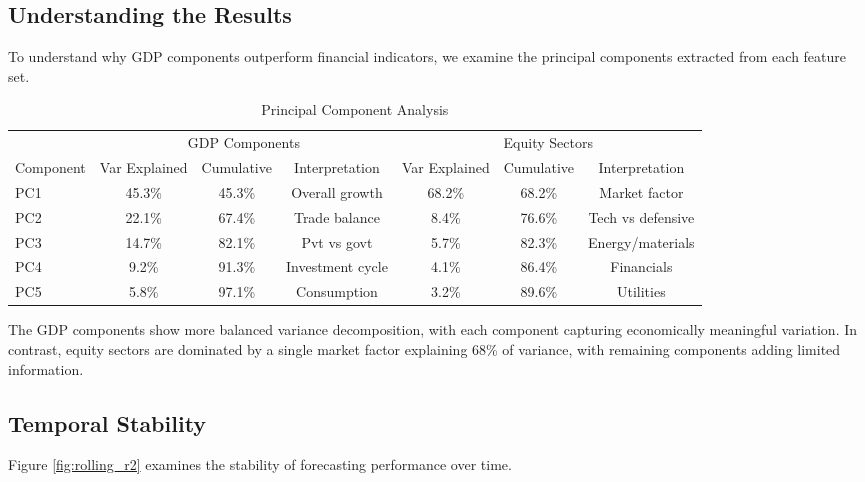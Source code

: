 \documentclass[11pt,letterpaper]{article}
\theoremstyle{plain}
\theoremstyle{definition}
\theoremstyle{remark}
\begin{document}
\subsection{Understanding the Results}

To understand why GDP components outperform financial indicators, we examine the principal components extracted from each feature set.

\begin{table}[htbp]
\centering
\caption{Principal Component Analysis}
\label{tab:pca}
\begin{tabular}{lcccccc}
\toprule
& \multicolumn{3}{c}{GDP Components} & \multicolumn{3}{c}{Equity Sectors} \\
\cmidrule(lr){2-4} \cmidrule(lr){5-7}
Component & Var Explained & Cumulative & Interpretation & Var Explained & Cumulative & Interpretation \\
\midrule
PC1 & 45.3\% & 45.3\% & Overall growth & 68.2\% & 68.2\% & Market factor \\
PC2 & 22.1\% & 67.4\% & Trade balance & 8.4\% & 76.6\% & Tech vs defensive \\
PC3 & 14.7\% & 82.1\% & Pvt vs govt & 5.7\% & 82.3\% & Energy/materials \\
PC4 & 9.2\% & 91.3\% & Investment cycle & 4.1\% & 86.4\% & Financials \\
PC5 & 5.8\% & 97.1\% & Consumption & 3.2\% & 89.6\% & Utilities \\
\bottomrule
\end{tabular}
\end{table}

The GDP components show more balanced variance decomposition, with each component capturing economically meaningful variation. In contrast, equity sectors are dominated by a single market factor explaining 68\% of variance, with remaining components adding limited information.

\subsection{Temporal Stability}

Figure \ref{fig:rolling_r2} examines the stability of forecasting performance over time.
\end{document}
